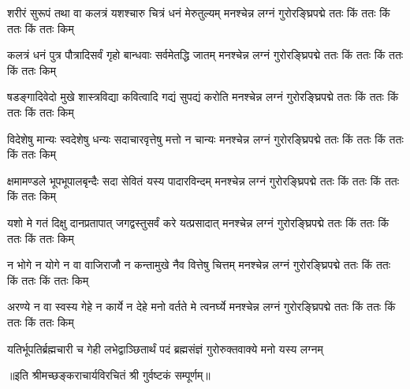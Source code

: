 

\fourlineindentedshloka
{शरीरं सुरूपं तथा वा कलत्रं}
{यशश्चारु चित्रं धनं मेरुतुल्यम्}
{मनश्चेन्न लग्नं गुरोरङ्घ्रिपद्मे}
{ततः किं ततः किं ततः किं ततः किम्}%
 

 \fourlineindentedshloka
{कलत्रं धनं पुत्र पौत्रादिसर्वं}
{गृहो बान्धवाः सर्वमेतद्धि जातम्}
{मनश्चेन्न लग्नं गुरोरङ्घ्रिपद्मे}
{ततः किं ततः किं ततः किं ततः किम्}%
 

\fourlineindentedshloka 
{षडङ्गादिवेदो मुखे शास्त्रविद्या}
{कवित्वादि गद्यं सुपद्यं करोति}
{मनश्चेन्न लग्नं गुरोरङ्घ्रिपद्मे}
{ततः किं ततः किं ततः किं ततः किम्}%
 

\fourlineindentedshloka 
{विदेशेषु मान्यः स्वदेशेषु धन्यः}
{सदाचारवृत्तेषु मत्तो न चान्यः}
{मनश्चेन्न लग्नं गुरोरङ्घ्रिपद्मे}
{ततः किं ततः किं ततः किं ततः किम्}%
 

\fourlineindentedshloka 
{क्षमामण्डले भूपभूपालबृन्दैः}
{सदा सेवितं यस्य पादारविन्दम्}
{मनश्चेन्न लग्नं गुरोरङ्घ्रिपद्मे}
{ततः किं ततः किं ततः किं ततः किम्}%
 
\fourlineindentedshloka 
{यशो मे गतं दिक्षु दानप्रतापात्}
{जगद्वस्तुसर्वं करे यत्प्रसादात्}
{मनश्चेन्न लग्नं गुरोरङ्घ्रिपद्मे}
{ततः किं ततः किं ततः किं ततः किम्}%
 
\fourlineindentedshloka 
{न भोगे न योगे न वा वाजिराजौ}
{न कन्तामुखे नैव वित्तेषु चित्तम्}
{मनश्चेन्न लग्नं गुरोरङ्घ्रिपद्मे}
{ततः किं ततः किं ततः किं ततः किम्}%
 

\fourlineindentedshloka 
{अरण्ये न वा स्वस्य गेहे न कार्ये}
{न देहे मनो वर्तते मे त्वनर्घ्ये}
{मनश्चेन्न लग्नं गुरोरङ्घ्रिपद्मे}
{ततः किं ततः किं ततः किं ततः किम्}%
 

{यतिर्भूपतिर्ब्रह्मचारी च गेही}
{लभेद्वाञ्छितार्थं पदं ब्रह्मसंज्ञं}
{गुरोरुक्तवाक्ये मनो यस्य लग्नम्}%
 

॥इति श्रीमच्छङ्कराचार्यविरचितं श्री गुर्वष्टकं सम्पूर्णम्॥